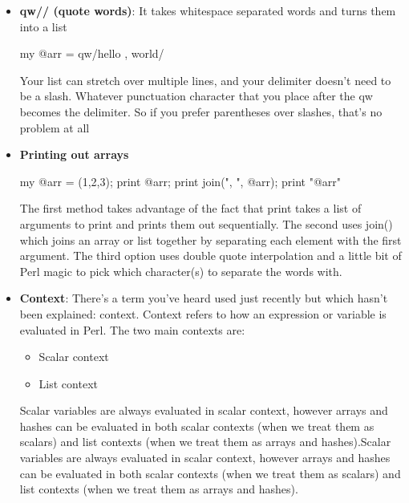 \documentclass{report}
\begin{document}
\begin{itemize}
            \bigbreak \noindent 
            Note that \texttt{\$\#arr} gets the index of the last element. We can also use
            \bigbreak \noindent 
            \begin{perlcode}
                my $size = @arr;
                print my $size = @arr;
            \end{perlcode}
        \item \textbf{qw// (quote words)}: It takes whitespace separated words and turns them into a list
            \bigbreak \noindent 
            \begin{perlcode}
                my @arr = qw/hello , world/
            \end{perlcode}
            \bigbreak \noindent 
            Your list can stretch over multiple lines, and your delimiter doesn’t need to be a slash. Whatever punctuation character that you place after the qw becomes the delimiter. So if you prefer parentheses over slashes, that’s no problem at all
        \item \textbf{Printing out arrays}
            \bigbreak \noindent 
            \begin{perlcode}
                my @arr = (1,2,3);
                print @arr;
                print join(", ", @arr);
                print "@arr"
            \end{perlcode}
            \bigbreak \noindent 
            The first method takes advantage of the fact that print takes a list of arguments to print and prints them out sequentially. The second uses join() which joins an array or list together by separating each element with the first argument. The third option uses double quote interpolation and a little bit of Perl magic to pick which character(s) to separate the words with.
        \item \textbf{Context}: There’s a term you’ve heard used just recently but which hasn’t been explained: context. Context refers to how an expression or variable is evaluated in Perl. The two main contexts are:
            \begin{itemize}
                \item Scalar context
                \item List context
            \end{itemize}
            Scalar variables are always evaluated in scalar context, however arrays and hashes can be evaluated in both scalar contexts (when we treat them as scalars) and list contexts (when we treat them as arrays and hashes).Scalar variables are always evaluated in scalar context, however arrays and hashes can be evaluated in both scalar contexts (when we treat them as scalars) and list contexts (when we treat them as arrays and hashes).

\end{itemize}
\end{document}
